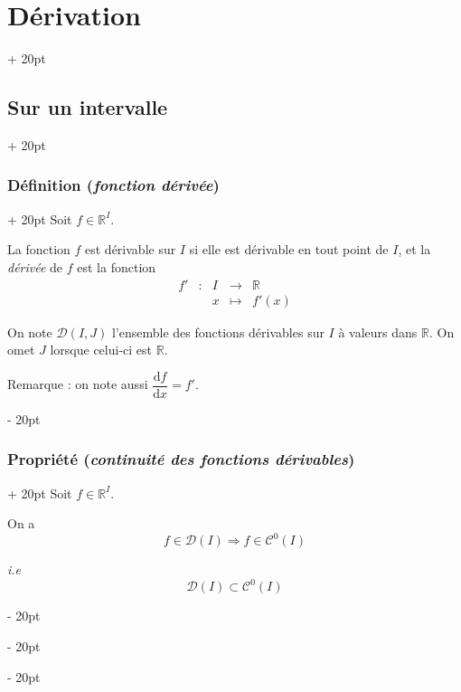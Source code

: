 \documentclass[a4paper, 12pt, twoside]{article}
\newcommand{\R}{\mathbb{R}} %
\newcommand{\ind}[1][20pt]{\advance\leftskip + #1}
\newcommand{\deind}[1][20pt]{\advance\leftskip - #1}
\newenvironment{indt}[2][20pt]{#2 \par \ind[#1]}{\par \deind} %
\begin{document}
\begin{indt}{\section{Dérivation}}
        \vspace{12pt}
        
        \begin{indt}{\subsection{Sur un intervalle}}
            \begin{indt}{\subsubsection{Définition (\textit{fonction dérivée})}}
                Soit $f \in \R^I$.

                La fonction $f$ est dérivable sur $I$ si elle est dérivable en tout point de $I$, et la \textit{dérivée} de $f$ est la fonction
                \[
                    \begin{array}{rcccc}
                        f' & : & I & \longrightarrow & \R
                        \\
                           && x & \longmapsto & f'(x)
                    \end{array}
                \]

                On note $\mathcal D(I, J)$ l'ensemble des fonctions dérivables sur $I$ à valeurs dans $\R$. On omet $J$ lorsque celui-ci est $\R$.

                Remarque : on note aussi $\dfrac{\mathrm df}{\mathrm dx} = f'$.
            \end{indt}

            \vspace{12pt}
            
            \begin{indt}{\subsubsection{Propriété (\textit{continuité des fonctions dérivables})}}
                Soit $f \in \R^I$.

                On a
                \[
                    f \in \mathcal D(I)
                    \Rightarrow
                    f \in \mathcal C^0(I)
                \]

                \textit{i.e}
                \[
                    \mathcal D(I) \subset \mathcal C^0(I)
                \]
            \end{indt}

            \vspace{12pt}
            

\end{indt}
\end{indt}
\end{document}
